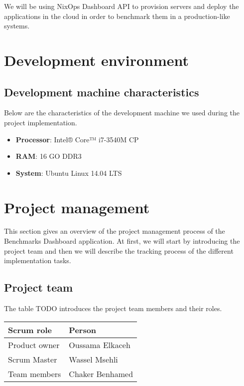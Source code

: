 We will be using NixOps Dashboard API to provision servers and deploy the
applications in the cloud in order to benchmark them in a production-like
systems.

\section{Development environment}
\subsection{Development machine characteristics}
Below are the characteristics of the development machine we used during the
project implementation.

\begin{itemize}
  \item{\textbf{Processor}: Intel® Core™ i7-3540M CP}
  \item{\textbf{RAM}: 16 GO DDR3 }
  \item{\textbf{System}: Ubuntu Linux 14.04 LTS}
\end{itemize}


\section{Project management}
This section gives an overview of the project management process of the
Benchmarks Dashboard application. At first, we will start by introducing the
project team and then we will describe the tracking process of the different
implementation tasks.
\subsection{Project team}
The table TODO introduces the project team members and their roles.

\begin{center}
  \begin{tabular}{ | p{3cm}  | p{6cm} |}
    \hline

    Scrum role    & Person          \\ \hline

    Product owner & Oussama Elkaceh \\ \hline
    Scrum Master  & Wassel Msehli   \\ \hline
    Team members  & Chaker Benhamed \\ \hline

    \hline
  \end{tabular}
\end{center}

